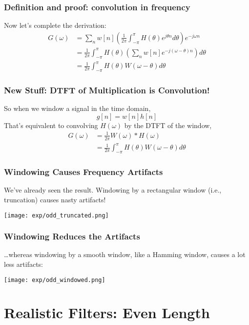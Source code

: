 \documentclass{beamer}
\begin{document}
\begin{frame}
  \frametitle{Definition and proof: convolution in frequency}

  Now let's complete the derivation:
  \begin{align*}
    G(\omega) &= \sum_n w[n]\left(\frac{1}{2\pi}\int_{-\pi}^\pi
    H(\theta)e^{j\theta n}d\theta\right) e^{-j\omega n}\\
    &= \frac{1}{2\pi} \int_{-\pi}^\pi H(\theta)\left(\sum_n w[n]e^{-j(\omega-\theta) n}\right)d\theta\\
    &= \frac{1}{2\pi} \int_{-\pi}^\pi H(\theta)W(\omega-\theta)d\theta
  \end{align*}
\end{frame}

\begin{frame}
  \frametitle{New Stuff: DTFT of Multiplication is Convolution!}

  So when we window a signal in the time domain,
  \[
  g[n] = w[n]h[n]
  \]
  That's equivalent to convolving $H(\omega)$ by the DTFT of the window,
  \begin{align*}
    G(\omega) &= \frac{1}{2\pi} W(\omega) \ast H(\omega)\\
    &= \frac{1}{2\pi} \int_{-\pi}^\pi H(\theta)W(\omega-\theta)d\theta    
  \end{align*}
  
\end{frame}

\begin{frame}
  \frametitle{Windowing Causes Frequency Artifacts}

  We've already seen the result.  Windowing by a rectangular window
  (i.e., truncation) causes nasty artifacts!

  \centerline{\texttt{[image: exp/odd\_truncated.png]}}
\end{frame}

\begin{frame}
  \frametitle{Windowing Reduces the Artifacts}

  \ldots whereas windowing by a smooth window, like a Hamming window,
  causes a lot less artifacts:
  
  \centerline{\texttt{[image: exp/odd\_windowed.png]}}
\end{frame}



\section[Even Length]{Realistic Filters: Even Length}
\setcounter{subsection}{1}
\end{document}
